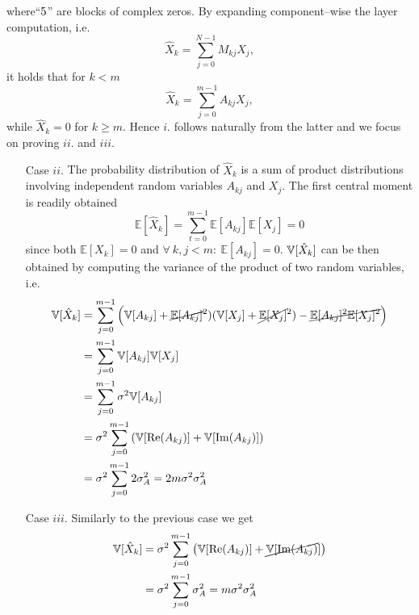     where``$5$'' are blocks of complex zeros. By expanding component--wise the layer computation, i.e.
    \[
        \hat X_k = \sum_{j=0}^{N-1} M_{kj}X_j,
    \]
    it holds that for $k<m$
    \[
        \hat X_k = \sum_{j=0}^{m-1} A_{kj}X_j,
    \]
    while $\hat X_k = 0$ for $k\geq m$. Hence $i.$ follows naturally from the latter and we focus on proving $ii.$ and $iii.$
    \begin{itemize}
        \item[Case $ii.$] The probability distribution of $\hat X_k$ is a sum of product distributions involving independent random variables $A_{kj}$ and $X_j$. The first central moment is readily obtained
        \[
            \mathbb{E}[\hat{X}_k] = \sum_{t=0}^{m-1} \mathbb{E}[A_{kj}] \mathbb{E}[X_j] = 0
        \]
    since both $\mathbb{E}[X_k] = 0$ and $\forall~ k,j<m: ~ \mathbb{E}[A_{kj}] = 0$. $\mathbb{V}[\hat X_k]$ can be then obtained by computing the variance of the product of two random variables, i.e.
    \begin{equation*}
        \begin{aligned}
            \mathbb{V}[\hat X_k] &= \sum_{j=0}^{m-1} \Big(\mathbb{V}[A_{kj}] + \cancel{\mathbb{E}[A_{kj}]}^2) (\mathbb{V}[{X_{j}}] + \cancel{\mathbb{E}[{X_{j}}]}^2) - \cancel{\mathbb{E}[A_{kj}]^2\mathbb{E}[{X_{j}}]^2}\Big) \\
            &= \sum_{j=0}^{m-1} \mathbb{V}[A_{kj}] \mathbb{V}[{X_{j}}] \\
            &= \sum_{j=0}^{m-1} \sigma^2 \mathbb{V}[A_{kj}] \\
            &= \sigma^2\sum_{j=0}^{m-1}\left(\mathbb{V}[\Re(A_{kj})] + \mathbb{V}[\Im(A_{kj})]\right)\\
            &= \sigma^2\sum_{j=0}^{m-1}2\sigma^2_A =  2 m \sigma^2 \sigma_{A}^2
        \end{aligned}
    \end{equation*}
    \item[Case $iii.$] Similarly to the previous case we get 
    \[
        \begin{aligned}
            \mathbb{V}[\hat X_k] &= \sigma^2\sum_{j=0}^{m-1}\left(\mathbb{V}[\Re(A_{kj})] + \cancel{\mathbb{V}[\Im(A_{kj})}]\right)\\
            &= \sigma^2\sum_{j=0}^{m-1}\sigma^2_A=  m \sigma^2 \sigma_{A}^2
        \end{aligned}
    \]
    \end{itemize}
\endproof
%
